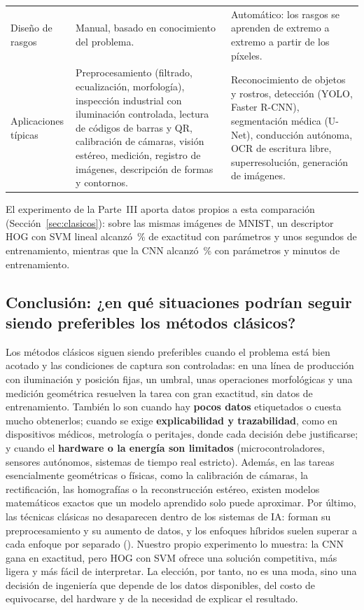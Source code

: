 \documentclass[11pt,letterpaper]{article}
\makeatletter
\newcommand{\pct}{\,\%}
\newcommand{\cit@chk}[1]{\ifcsdef{citA@#1}{}{\PackageError{citas}{Cita no definida: #1}{}}}
\newcommand{\cit@item}[1]{\cit@chk{#1}\cit@sep\csuse{citA@#1}, \csuse{citY@#1}\gdef\cit@sep{; }}
\newcommand{\parencite}[1]{(\gdef\cit@sep{}\forcsvlist{\cit@item}{#1})}
\makeatother
\begin{document}
\begin{table}[H]
\begin{tabularx}{\linewidth}{>{\bfseries\raggedright\arraybackslash}p{2.95cm}>{\raggedright\arraybackslash}X>{\raggedright\arraybackslash}X}
\addlinespace
Diseño de rasgos & Manual, basado en conocimiento del problema. & Automático: los rasgos se aprenden de extremo a extremo a partir de los píxeles. \\
\addlinespace
Aplicaciones típicas & Preprocesamiento (filtrado, ecualización, morfología), inspección industrial con iluminación controlada, lectura de códigos de barras y QR, calibración de cámaras, visión estéreo, medición, registro de imágenes, descripción de formas y contornos. & Reconocimiento de objetos y rostros, detección (YOLO, Faster R-CNN), segmentación médica (U-Net), conducción autónoma, OCR de escritura libre, superresolución, generación de imágenes. \\
\bottomrule
\end{tabularx}
\end{table}

El experimento de la Parte~III aporta datos propios a esta comparación (Sección~\ref{sec:clasicos}): sobre las mismas imágenes de MNIST, un descriptor HOG con SVM lineal alcanzó \HogAcc\pct{} de exactitud con \HogParam{} parámetros y unos \HogAjuste{} segundos de entrenamiento, mientras que la CNN alcanzó \AccTest\pct{} con \ParamTotal{} parámetros y \TiempoEntMin{} minutos de entrenamiento.

\subsection*{Conclusión: ¿en qué situaciones podrían seguir siendo preferibles los métodos clásicos?}

Los métodos clásicos siguen siendo preferibles cuando el problema está bien acotado y las condiciones de captura son controladas: en una línea de producción con iluminación y posición fijas, un umbral, unas operaciones morfológicas y una medición geométrica resuelven la tarea con gran exactitud, sin datos de entrenamiento. También lo son cuando hay \textbf{pocos datos} etiquetados o cuesta mucho obtenerlos; cuando se exige \textbf{explicabilidad y trazabilidad}, como en dispositivos médicos, metrología o peritajes, donde cada decisión debe justificarse; y cuando el \textbf{hardware o la energía son limitados} (microcontroladores, sensores autónomos, sistemas de tiempo real estricto). Además, en las tareas esencialmente geométricas o físicas, como la calibración de cámaras, la rectificación, las homografías o la reconstrucción estéreo, existen modelos matemáticos exactos que un modelo aprendido solo puede aproximar. Por último, las técnicas clásicas no desaparecen dentro de los sistemas de IA: forman su preprocesamiento y su aumento de datos, y los enfoques híbridos suelen superar a cada enfoque por separado \parencite{omahony2020}. Nuestro propio experimento lo muestra: la CNN gana en exactitud, pero HOG con SVM ofrece una solución competitiva, más ligera y más fácil de interpretar. La elección, por tanto, no es una moda, sino una decisión de ingeniería que depende de los datos disponibles, del costo de equivocarse, del hardware y de la necesidad de explicar el resultado.
\end{document}
